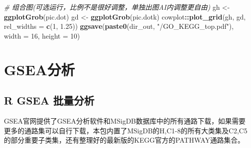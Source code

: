 \documentclass[
]{book}
\newenvironment{Shaded}{\begin{snugshade}}{\end{snugshade}}
\newcommand{\AttributeTok}[1]{\textcolor[rgb]{0.13,0.29,0.53}{#1}}
\newcommand{\CommentTok}[1]{\textcolor[rgb]{0.56,0.35,0.01}{\textit{#1}}}
\newcommand{\DecValTok}[1]{\textcolor[rgb]{0.00,0.00,0.81}{#1}}
\newcommand{\FloatTok}[1]{\textcolor[rgb]{0.00,0.00,0.81}{#1}}
\newcommand{\FunctionTok}[1]{\textcolor[rgb]{0.13,0.29,0.53}{\textbf{#1}}}
\newcommand{\NormalTok}[1]{#1}
\newcommand{\OtherTok}[1]{\textcolor[rgb]{0.56,0.35,0.01}{#1}}
\newcommand{\SpecialCharTok}[1]{\textcolor[rgb]{0.81,0.36,0.00}{\textbf{#1}}}
\newcommand{\StringTok}[1]{\textcolor[rgb]{0.31,0.60,0.02}{#1}}
\begin{document}
\begin{Shaded}
\begin{Highlighting}[]
\CommentTok{\# 组合图(可选运行，比例不是很好调整，单独出图AI内调整更自由)}
\NormalTok{gh }\OtherTok{\textless{}{-}} \FunctionTok{ggplotGrob}\NormalTok{(pic.dot)}
\NormalTok{gd }\OtherTok{\textless{}{-}} \FunctionTok{ggplotGrob}\NormalTok{(pic.dotk)}
\NormalTok{cowplot}\SpecialCharTok{::}\FunctionTok{plot\_grid}\NormalTok{(gh, gd, }\AttributeTok{rel\_widths =} \FunctionTok{c}\NormalTok{(}\DecValTok{1}\NormalTok{, }\FloatTok{1.25}\NormalTok{))}
\FunctionTok{ggsave}\NormalTok{(}\FunctionTok{paste0}\NormalTok{(dir\_out, }\StringTok{"/GO\_KEGG\_top.pdf"}\NormalTok{), }\AttributeTok{width =} \DecValTok{16}\NormalTok{, }\AttributeTok{height =} \DecValTok{10}\NormalTok{)}
\end{Highlighting}
\end{Shaded}

\section{GSEA分析}\label{enrich-gsea}

\subsection{R GSEA 批量分析}\label{r-gsea-ux6279ux91cfux5206ux6790}

GSEA官网提供了GSEA分析软件和MSigDB数据库中的所有通路下载，如果需要更多的通路集可以自行下载，本包内置了MSigDB的H,C1-8的所有大类集及C2,C5的部分重要子类集，还有整理好的最新版的KEGG官方的PATHWAY通路集合。
\end{document}
